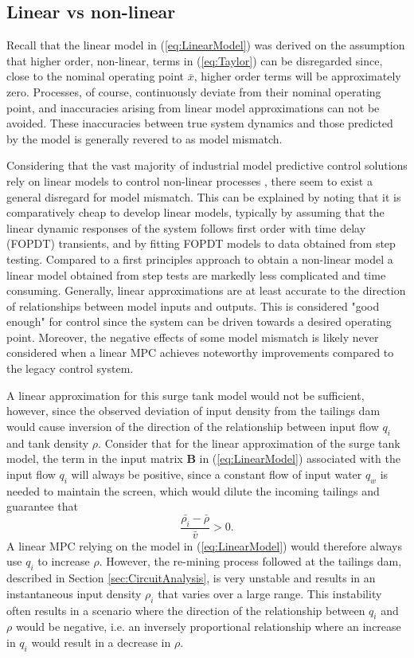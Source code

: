 \documentclass[preprint,authoryear,12pt]{elsarticle}
\begin{document}
\subsection{Linear vs non-linear}\label{sec:ModelValidation}
Recall that the linear model in (\ref{eq:LinearModel}) was derived on the assumption that higher order, non-linear, terms in (\ref{eq:Taylor}) can be disregarded since, close to the nominal operating point $\bar{x}$, higher order terms will be approximately zero. Processes, of course, continuously deviate from their nominal operating point, and inaccuracies arising from linear model approximations can not be avoided. These inaccuracies between true system dynamics and those predicted by the model is generally revered to as model mismatch.

Considering that the vast majority of industrial model predictive control solutions rely on linear models to control non-linear processes \citep{QinAndBadgwell2003}, there seem to exist a general disregard for model mismatch. This can be explained by noting that it is comparatively cheap to develop linear models, typically by assuming that the linear dynamic responses of the system follows first order with time delay (FOPDT) transients, and by fitting FOPDT models to data obtained from step testing. Compared to a first principles approach to obtain a non-linear model a linear model obtained from step tests are markedly less complicated and time consuming. Generally, linear approximations are at least accurate to the direction of relationships between model inputs and outputs. This is considered "good enough" for control since the system can be driven towards a desired operating point. Moreover, the negative effects of some model mismatch is likely never considered when a linear MPC achieves noteworthy improvements compared to the legacy control system. 

A linear approximation for this surge tank model would not be sufficient, however, since the observed deviation of input density from the tailings dam would cause inversion of the direction of the relationship between input flow $q_i$ and tank density $\rho$. Consider that for the linear approximation of the surge tank model, the term in the input matrix $\boldsymbol{B}$ in (\ref{eq:LinearModel}) associated with the input flow $q_i$ will always be positive, since a constant flow of input water $q_w$ is needed to maintain the screen, which would dilute the incoming tailings and guarantee that 
\begin{equation}
	\frac{\bar{\rho_i} - \bar{\rho}}{\bar{v}} > 0 .
\end{equation}
A linear MPC relying on the model in (\ref{eq:LinearModel}) would therefore always use $q_i$ to increase $\rho$. However, the re-mining process followed at the tailings dam, described in Section \ref{sec:CircuitAnalysis}, is very unstable and results in an instantaneous input density $\rho_i$ that varies over a large range. This instability often results in a scenario where the direction of the relationship between $q_i$ and $\rho$ would be negative, i.e. an inversely proportional relationship where an increase in $q_i$ would result in a decrease in $\rho$. 
\end{document}
